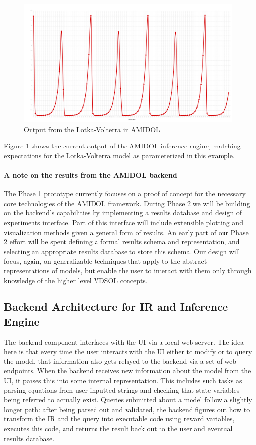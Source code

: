 \documentclass[11pt]{article}
\newcommand{\amidol}{\textsc{AMIDOL}}
\begin{document}
\begin{figure}
  \includegraphics[width=\textwidth]{figs/bunnies.png}
\caption{Output from the Lotka-Volterra in \amidol{}}
\label{Fig:LKOut}
\end{figure}

Figure \ref{Fig:LKOut} shows the current output of the \amidol{} inference engine, matching expectations for the Lotka-Volterra model as parameterized in this example.

\paragraph{A note on the results from the \amidol{} backend}

The Phase 1 prototype currently focuses on a proof of concept for the necessary core technologies of the \amidol{} framework.  During Phase 2 we will be building on the backend's capabilities by implementing a results database and design of experiments interface.  Part of this interface will include extensible plotting and visualization methods given a general form of results.  An early part of our Phase 2 effort will be spent defining a formal results schema and representation, and selecting an appropriate results database to store this schema.  Our design will focus, again, on generalizable techniques that apply to the abstract representations of models, but enable the user to interact with them only through knowledge of the higher level VDSOL concepts.

\subsection{Backend Architecture for IR and Inference Engine}

The backend component interfaces with the UI via a local web server. The idea here is that every time the user interacts with the UI either to modify or to query the model, that information also gets relayed to the backend via a set of web endpoints. When the backend receives new information about the model from the UI, it parses this into some internal representation. This includes such tasks as parsing equations from user-inputted strings and checking that state variables being referred to actually exist. Queries submitted about a model follow a slightly longer path: after being parsed out and validated, the backend figures out how to transform the IR and the query into executable code using reward variables, executes this code, and returns the result back out to the user and eventual results database.
\end{document}
